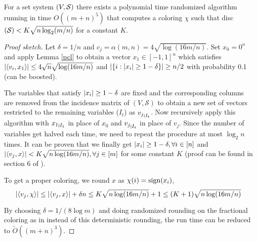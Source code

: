\begin{theorem}
For a set system $\left(V,\mathcal{S} \right )$ there exists a polynomial time randomized algorithm running in time $O((m+n)^5)$ that computes a coloring $\chi$ such that disc$\left(\mathcal{S} \right ) < K\sqrt{n\log_2(m/n)}$ for a constant $K$.
\end{theorem}
\begin{proof}[Proof sketch]
Let $\delta = 1/n$ and $c_j = \alpha(m,n) = 4 \sqrt{\log(16m/n)}$.
Set $x_0 =0^n$ and apply Lemma \ref{pcl} to obtain a vector $x_1 \in [-1,1]^n$ which satisfies
$\left\lvert \left\langle v_i,x_1\right\rangle \right\rvert \leq 4\sqrt{n}\sqrt{\log(16m/n)}$
and $\left\lvert \left\{i: \left\lvert x_i \right\rvert \geq 1 - \delta\right\} \right\rvert \geq n/2$ with probability 0.1 (can be boosted).

The variables that satisfy $\left\lvert x_i \right\rvert \ge 1-\delta$ are fixed
and the corresponding columns are removed from the incidence matrix of $(V,\mathcal{S})$
to obtain a new set of vectors restricted to the remaining variables
($I_t$) as ${v_j}_{\mkern 1mu \vrule height 1ex\mkern2mu {I_t}}$.
Now recursively apply this algorithm with ${x_1}_{\mkern 1mu \vrule height 1ex\mkern2mu {I_1}}$
in place of $x_0$ and ${v_j}_{\mkern 1mu \vrule height 1ex\mkern2mu {I_t}}$ in place of $v_j$.
Since the number of variables get halved each time,
we need to repeat the procedure at most $\log_2 n$ times.
It can be proven that we finally get
$\left\lvert x_i \right\rvert \geq 1 - \delta, \forall i \in [n]$ and
$\left\lvert \left\langle v_j,x\right\rangle \right\rvert < K\sqrt{n\log(16m/n)}, \forall j \in [m]$ for some constant $K$
(proof can be found in section 6 of \cite{12lovettmeka}).

To get a proper coloring, we round $x$ as $\chi(i) = \operatorname{sign}(x_i)$,
\[ \left\lvert \left\langle v_j,\chi\right\rangle \right\rvert \le \left\lvert \left\langle v_j,x\right\rangle \right\rvert + \delta n
\leq K\sqrt{n\log(16m/n)} + 1 \leq (K+1)\sqrt{n\log(16m/n)} \]

By choosing $\delta = 1/(8 \log m)$ and doing randomized rounding on the fractional coloring as in \cite{12lovettmeka} instead of this deterministic rounding, the run time can be reduced to
$\widetilde{O}((m+n)^3)$.
\end{proof}
